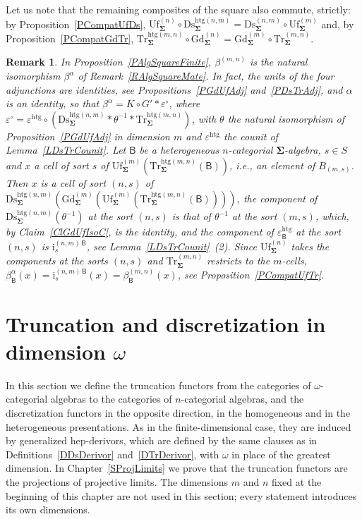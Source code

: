 \documentclass[a4paper, reqno]{amsbook}
\newcommand{\sig}[1]{\mathbf{#1}}             %
\newcommand{\calg}[1]{\boldsymbol{\mathsf{#1}}} %
\newcommand{\htg}{\mathrm{htg}}                %
\newcommand{\Gd}{\mathrm{Gd}}
\newcommand{\Uf}{\mathrm{Uf}}
\newcommand{\Ds}{\mathrm{Ds}}
\newcommand{\Tr}{\mathrm{Tr}}
\theoremstyle{plain}
\newtheorem{remark}[theorem]{Remark}
\theoremstyle{definition}
\begin{document}
Let us note that the remaining composites of the square also commute, strictly: by Proposition~\ref{PCompatUfDs}, $\Uf^{(n)}_{\sig{\Sigma}}\circ\Ds^{\htg(n,m)}_{\sig{\Sigma}}=\Ds^{(n,m)}_{\sig{\Sigma}}\circ\Uf^{(m)}_{\sig{\Sigma}}$ and, by Proposition~\ref{PCompatGdTr}, $\Tr^{\htg(m,n)}_{\sig{\Sigma}}\circ\Gd^{(n)}_{\sig{\Sigma}}=\Gd^{(m)}_{\sig{\Sigma}}\circ\Tr^{(m,n)}_{\sig{\Sigma}}$.

\begin{remark}\label{RAlgSquareFiniteMate}
In Proposition~\ref{PAlgSquareFinite}, $\beta^{(m,n)}$ is the natural isomorphism $\beta^{\alpha}$ of Remark~\ref{RAlgSquareMate}.
In fact, the units of the four adjunctions are identities, see Propositions~\ref{PGdUfAdj} and~\ref{PDsTrAdj}, and $\alpha$ is an identity, so that $\beta^{\alpha}=K\circ G'\ast\varepsilon^{\circ}$, where $\varepsilon^{\circ}=\varepsilon^{\htg}\circ(\Ds^{\htg(n,m)}_{\sig{\Sigma}}\ast\theta^{-1}\ast\Tr^{\htg(m,n)}_{\sig{\Sigma}})$, with $\theta$ the natural isomorphism of Proposition~\ref{PGdUfAdj} in dimension $m$ and $\varepsilon^{\htg}$ the counit of Lemma~\ref{LDsTrCounit}.
Let $\calg{B}$ be a heterogeneous $n$-categorial $\sig{\Sigma}$-algebra, $s\in S$ and $x$ a cell of sort $s$ of $\Uf^{(m)}_{\sig{\Sigma}}(\Tr^{\htg(m,n)}_{\sig{\Sigma}}(\calg{B}))$, i.e., an element of $B_{(m,s)}$.
Then $x$ is a cell of sort $(n,s)$ of $\Ds^{\htg(n,m)}_{\sig{\Sigma}}(\Gd^{(m)}_{\sig{\Sigma}}(\Uf^{(m)}_{\sig{\Sigma}}(\Tr^{\htg(m,n)}_{\sig{\Sigma}}(\calg{B}))))$, the component of $\Ds^{\htg(n,m)}_{\sig{\Sigma}}(\theta^{-1})$ at the sort $(n,s)$ is that of $\theta^{-1}$ at the sort $(m,s)$, which, by Claim~\ref{ClGdUfIsoC}, is the identity, and the component of $\varepsilon^{\htg}_{\calg{B}}$ at the sort $(n,s)$ is $\mathrm{i}^{(n,m)\,\calg{B}}_{s}$, see Lemma~\ref{LDsTrCounit}~(2).
Since $\Uf^{(n)}_{\sig{\Sigma}}$ takes the components at the sorts $(n,s)$ and $\Tr^{(m,n)}_{\sig{\Sigma}}$ restricts to the $m$-cells, $\beta^{\alpha}_{\calg{B}}(x)=\mathrm{i}^{(n,m)\,\calg{B}}_{s}(x)=\beta^{(m,n)}_{\calg{B}}(x)$, see Proposition~\ref{PCompatUfTr}.
\end{remark}

\section{Truncation and discretization in dimension \texorpdfstring{$\omega$}{omega}}\label{SDsTrOmega}

In this section we define the truncation functors from the categories of $\omega$-categorial algebras to the categories of $n$-categorial algebras, and the discretization functors in the opposite direction, in the homogeneous and in the heterogeneous presentations.
As in the finite-dimensional case, they are induced by generalized hep-derivors, which are defined by the same clauses as in Definitions~\ref{DDsDerivor} and~\ref{DTrDerivor}, with $\omega$ in place of the greatest dimension.
In Chapter~\ref{SProjLimits} we prove that the truncation functors are the projections of projective limits.
The dimensions $m$ and $n$ fixed at the beginning of this chapter are not used in this section; every statement introduces its own dimensions.
\end{document}

